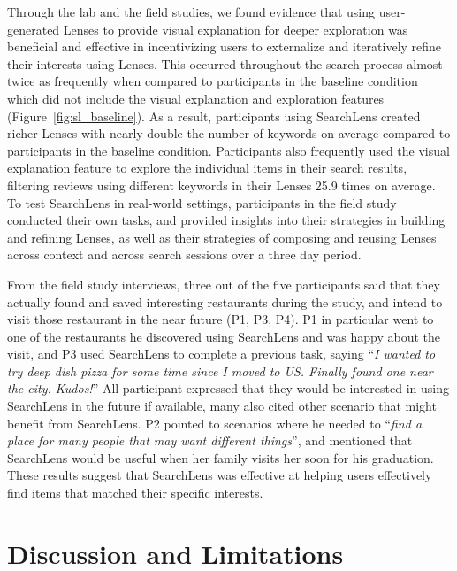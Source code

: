 Through the lab and the field studies, we found evidence that using user-generated Lenses to provide visual explanation for deeper exploration was beneficial and effective in incentivizing users to externalize and iteratively refine their interests using Lenses. This occurred throughout the search process almost twice as frequently when compared to participants in the baseline condition which did not include the visual explanation and exploration features (Figure~\ref{fig:sl_baseline}). As a result, participants using SearchLens created richer Lenses with nearly double the number of keywords on average compared to participants in the baseline condition. Participants also frequently used the visual explanation feature to explore the individual items in their search results, filtering reviews using different keywords in their Lenses 25.9 times on average. To test SearchLens in real-world settings, participants in the field study conducted their own tasks, and provided insights into their strategies in building and refining Lenses, as well as their strategies of composing and reusing Lenses across context and across search sessions over a three day period.

From the field study interviews, three out of the five participants said that they actually found and saved interesting restaurants during the study, and intend to visit those restaurant in the near future (P1, P3, P4). P1 in particular went to one of the restaurants he discovered using SearchLens and was happy about the visit, and P3 used SearchLens to complete a previous task, saying ``\emph{I wanted to try deep dish pizza for some time since I moved to US. Finally found one near the city. Kudos!}'' All participant expressed that they would be interested in using SearchLens in the future if available, many also cited other scenario that might benefit from SearchLens. P2 pointed to scenarios where he needed to ``\emph{find a place for many people that may want different things}'', and mentioned that SearchLens would be useful when her family visits her soon for his graduation. These results suggest that SearchLens was effective at helping users effectively find items that matched their specific interests. 

\section{Discussion and Limitations}

